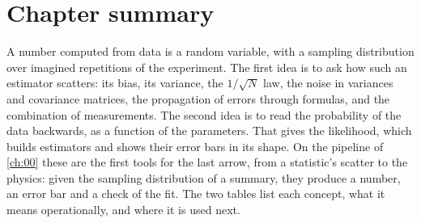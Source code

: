 \section*{Chapter summary}
\label{3b:sec:summary}

A number computed from data is a random variable, with a sampling
distribution over imagined repetitions of the experiment. The first idea
is to ask how such an estimator scatters: its bias, its variance, the
$1/\sqrt N$ law, the noise in variances and covariance matrices, the
propagation of errors through formulas, and the combination of
measurements. The second idea is to read the probability of the data
backwards, as a function of the parameters. That gives the likelihood,
which builds estimators and shows their error bars in its shape. On the
pipeline of \cref{ch:00} these are the first tools for the last arrow, from
a statistic's scatter to the physics: given the sampling distribution of a
summary, they produce a number, an error bar and a check of the fit. The
two tables list each concept, what it means operationally, and where it is
used next.

